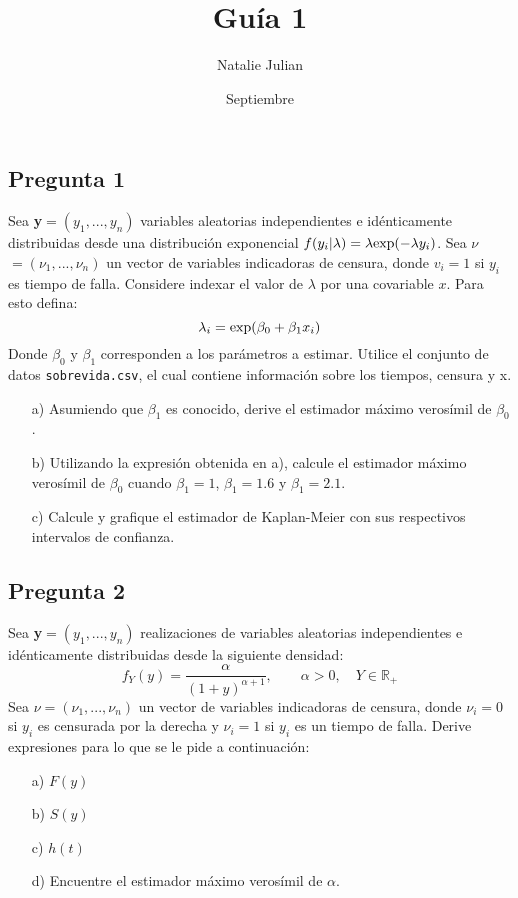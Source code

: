 \documentclass[10pt]{article}\usepackage[]{graphicx}\usepackage[]{color}
\title{Guía 1}
\author{Natalie Julian}
\date{Septiembre}
\begin{document}
\maketitle 
\subsection*{Pregunta 1}
Sea \textbf{y}$=(y_{1},...,y_{n})$ variables aleatorias independientes e idénticamente distribuidas desde una distribución exponencial $f(y_{i}|\lambda)=\lambda \textnormal{exp}(-\lambda y_{i})$. Sea \textbf{$\nu$}$=(\nu_{1},...,\nu_{n})$ un vector de variables indicadoras de censura, donde $v_{i}=1$ si $y_{i}$ es tiempo de falla. Considere indexar el valor de $\lambda$ por una covariable $x$. Para esto defina:
$$\lambda_{i}=\textnormal{exp}(\beta_{0}+\beta_{1}x_{i})$$
Donde $\beta_{0}$ y $\beta_{1}$ corresponden a los parámetros a estimar. Utilice el conjunto de datos \texttt{sobrevida.csv}, el cual contiene información sobre los tiempos, censura y x.\\

\begin{itemize}
\item[a)] Asumiendo que $\beta_{1}$ es conocido, derive el estimador máximo verosímil de $\beta_{0}$.
\item[b)] Utilizando la expresión obtenida en a), calcule el estimador máximo verosímil de $\beta_{0}$ cuando $\beta_{1}=1$, $\beta_{1}=1.6$ y $\beta_{1}=2.1$.
\item[c)] Calcule y grafique el estimador de Kaplan-Meier con sus respectivos intervalos de confianza.

\end{itemize}

\subsection*{Pregunta 2} 
Sea \textbf{y}$=(y_{1},...,y_{n})$ realizaciones de variables aleatorias independientes e idénticamente distribuidas desde la siguiente densidad:
$$f_{Y}(y)=\frac{\alpha}{(1+y)^{\alpha+1}}, \qquad \alpha>0, \quad Y\in \mathbb{R}_{+}$$
Sea $\nu=(\nu_{1},...,\nu_{n})$ un vector de variables indicadoras de censura, donde $\nu_{i}=0$ si $y_{i}$ es censurada por la derecha y $\nu_{i}=1$ si $y_{i}$ es un tiempo de falla. Derive expresiones para lo que se le pide a continuación:

\begin{itemize}
\item[a)] $F(y)$ 
\item[b)] $S(y)$ 
\item[c)] $h(t)$
\item[d)] Encuentre el estimador máximo verosímil de $\alpha$. 
\end{itemize}
\end{document}
